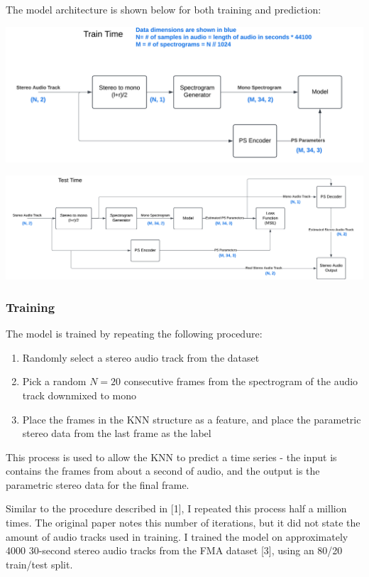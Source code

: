 \documentclass{article}
\begin{document}
The model architecture is shown below for both training and prediction:
\begin{center}
  \includegraphics[width=1.0\textwidth]{train.png}
\end{center}

\begin{center}
  \includegraphics[width=1.0\textwidth]{test.png}
\end{center}

\subsubsection{Training}
The model is trained by repeating the following procedure:
\begin{enumerate}
  \item Randomly select a stereo audio track from the dataset
  \item Pick a random $N=20$ consecutive frames from the spectrogram of the audio track downmixed to mono
  \item Place the frames in the KNN structure as a feature, and place the parametric stereo data from the last frame as the label
\end{enumerate}

This process is used to allow the KNN to predict a time series - the input is contains the frames from about a second of audio, and the output is the parametric stereo data for the final frame.

Similar to the procedure described in [1], I repeated this process half a million times. The original paper notes this number of iterations, but it did not state the amount of audio tracks used in training. I trained the model on approximately 4000 30-second stereo audio tracks from the FMA dataset [3], using an 80/20 train/test split.
\end{document}
